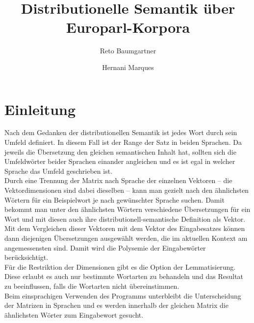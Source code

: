 \documentclass[11pt,twoside,openright]{mpreport}
\title{Distributionelle Semantik über Europarl-Korpora
}
\author{Reto Baumgartner \and Hernani Marques}
\begin{document}
\maketitle
\small
\tableofcontents
\normalsize

\chapter{Einleitung}
\label{cha:einleitung}
Nach dem Gedanken der distributionellen Semantik ist jedes Wort durch sein Umfeld definiert. In diesem Fall ist der Range der Satz in beiden Sprachen. Da jeweils die Übersetzung den gleichen semantischen Inhalt hat, sollten sich die Umfeldwörter beider Sprachen einander angleichen und es ist egal in welcher Sprache das Umfeld geschrieben ist.\\
Durch eine Trennung der Matrix nach Sprache der einzelnen Vektoren -- die Vektordimensionen sind dabei dieselben -- kann man gezielt nach den ähnlichsten Wörtern für ein Beispielwort je nach gewünschter Sprache suchen. Damit bekommt man unter den ähnlichsten Wörtern verschiedene Übersetzungen für ein Wort und mit diesen auch ihre distributionell-semantische Definition als Vektor. Mit dem Vergleichen dieser Vektoren mit dem Vektor des Eingabesatzes können dann diejenigen Übersetzungen ausgewählt werden, die im aktuellen Kontext am angemessensten sind. Damit wird die Polysemie der Eingabewörter berücksichtigt.\\
Für die Restriktion der Dimensionen gibt es die Option der Lemmatisierung. Diese erlaubt es auch nur bestimmte Wortarten zu behandeln und das Resultat zu beeinflussen, falls die Wortarten nicht übereinstimmen. \\
Beim einsprachigen Verwenden des Programms unterbleibt die Unterscheidung der Matrizen in Sprachen und es werden innerhalb der gleichen Matrix die ähnlichsten Wörter zum Eingabewort gesucht.

\end{document}
